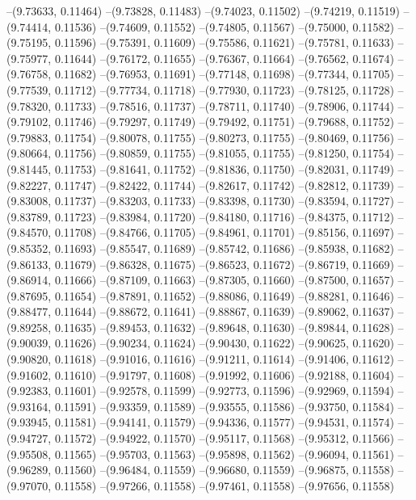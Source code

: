 --(9.73633, 0.11464)
--(9.73828, 0.11483)
--(9.74023, 0.11502)
--(9.74219, 0.11519)
--(9.74414, 0.11536)
--(9.74609, 0.11552)
--(9.74805, 0.11567)
--(9.75000, 0.11582)
--(9.75195, 0.11596)
--(9.75391, 0.11609)
--(9.75586, 0.11621)
--(9.75781, 0.11633)
--(9.75977, 0.11644)
--(9.76172, 0.11655)
--(9.76367, 0.11664)
--(9.76562, 0.11674)
--(9.76758, 0.11682)
--(9.76953, 0.11691)
--(9.77148, 0.11698)
--(9.77344, 0.11705)
--(9.77539, 0.11712)
--(9.77734, 0.11718)
--(9.77930, 0.11723)
--(9.78125, 0.11728)
--(9.78320, 0.11733)
--(9.78516, 0.11737)
--(9.78711, 0.11740)
--(9.78906, 0.11744)
--(9.79102, 0.11746)
--(9.79297, 0.11749)
--(9.79492, 0.11751)
--(9.79688, 0.11752)
--(9.79883, 0.11754)
--(9.80078, 0.11755)
--(9.80273, 0.11755)
--(9.80469, 0.11756)
--(9.80664, 0.11756)
--(9.80859, 0.11755)
--(9.81055, 0.11755)
--(9.81250, 0.11754)
--(9.81445, 0.11753)
--(9.81641, 0.11752)
--(9.81836, 0.11750)
--(9.82031, 0.11749)
--(9.82227, 0.11747)
--(9.82422, 0.11744)
--(9.82617, 0.11742)
--(9.82812, 0.11739)
--(9.83008, 0.11737)
--(9.83203, 0.11733)
--(9.83398, 0.11730)
--(9.83594, 0.11727)
--(9.83789, 0.11723)
--(9.83984, 0.11720)
--(9.84180, 0.11716)
--(9.84375, 0.11712)
--(9.84570, 0.11708)
--(9.84766, 0.11705)
--(9.84961, 0.11701)
--(9.85156, 0.11697)
--(9.85352, 0.11693)
--(9.85547, 0.11689)
--(9.85742, 0.11686)
--(9.85938, 0.11682)
--(9.86133, 0.11679)
--(9.86328, 0.11675)
--(9.86523, 0.11672)
--(9.86719, 0.11669)
--(9.86914, 0.11666)
--(9.87109, 0.11663)
--(9.87305, 0.11660)
--(9.87500, 0.11657)
--(9.87695, 0.11654)
--(9.87891, 0.11652)
--(9.88086, 0.11649)
--(9.88281, 0.11646)
--(9.88477, 0.11644)
--(9.88672, 0.11641)
--(9.88867, 0.11639)
--(9.89062, 0.11637)
--(9.89258, 0.11635)
--(9.89453, 0.11632)
--(9.89648, 0.11630)
--(9.89844, 0.11628)
--(9.90039, 0.11626)
--(9.90234, 0.11624)
--(9.90430, 0.11622)
--(9.90625, 0.11620)
--(9.90820, 0.11618)
--(9.91016, 0.11616)
--(9.91211, 0.11614)
--(9.91406, 0.11612)
--(9.91602, 0.11610)
--(9.91797, 0.11608)
--(9.91992, 0.11606)
--(9.92188, 0.11604)
--(9.92383, 0.11601)
--(9.92578, 0.11599)
--(9.92773, 0.11596)
--(9.92969, 0.11594)
--(9.93164, 0.11591)
--(9.93359, 0.11589)
--(9.93555, 0.11586)
--(9.93750, 0.11584)
--(9.93945, 0.11581)
--(9.94141, 0.11579)
--(9.94336, 0.11577)
--(9.94531, 0.11574)
--(9.94727, 0.11572)
--(9.94922, 0.11570)
--(9.95117, 0.11568)
--(9.95312, 0.11566)
--(9.95508, 0.11565)
--(9.95703, 0.11563)
--(9.95898, 0.11562)
--(9.96094, 0.11561)
--(9.96289, 0.11560)
--(9.96484, 0.11559)
--(9.96680, 0.11559)
--(9.96875, 0.11558)
--(9.97070, 0.11558)
--(9.97266, 0.11558)
--(9.97461, 0.11558)
--(9.97656, 0.11558)
